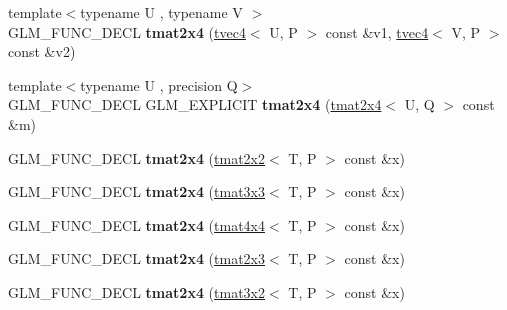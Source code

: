\begin{DoxyCompactItemize}
\item 
\hypertarget{structglm_1_1tmat2x4_ab52cdbf9a2f1ae4b9b8d3e6ef8e84039}{{\footnotesize template$<$typename U , typename V $>$ }\\G\-L\-M\-\_\-\-F\-U\-N\-C\-\_\-\-D\-E\-C\-L {\bfseries tmat2x4} (\hyperlink{structglm_1_1tvec4}{tvec4}$<$ U, P $>$ const \&v1, \hyperlink{structglm_1_1tvec4}{tvec4}$<$ V, P $>$ const \&v2)}\label{structglm_1_1tmat2x4_ab52cdbf9a2f1ae4b9b8d3e6ef8e84039}

\item 
\hypertarget{structglm_1_1tmat2x4_a927ed33ecafc04dffbdc44b25e4b5466}{{\footnotesize template$<$typename U , precision Q$>$ }\\G\-L\-M\-\_\-\-F\-U\-N\-C\-\_\-\-D\-E\-C\-L G\-L\-M\-\_\-\-E\-X\-P\-L\-I\-C\-I\-T {\bfseries tmat2x4} (\hyperlink{structglm_1_1tmat2x4}{tmat2x4}$<$ U, Q $>$ const \&m)}\label{structglm_1_1tmat2x4_a927ed33ecafc04dffbdc44b25e4b5466}

\item 
\hypertarget{structglm_1_1tmat2x4_afc1dac325dc83720bcd251de94f5fdfc}{G\-L\-M\-\_\-\-F\-U\-N\-C\-\_\-\-D\-E\-C\-L {\bfseries tmat2x4} (\hyperlink{structglm_1_1tmat2x2}{tmat2x2}$<$ T, P $>$ const \&x)}\label{structglm_1_1tmat2x4_afc1dac325dc83720bcd251de94f5fdfc}

\item 
\hypertarget{structglm_1_1tmat2x4_a315e700449248bbe7938b858a94e98ce}{G\-L\-M\-\_\-\-F\-U\-N\-C\-\_\-\-D\-E\-C\-L {\bfseries tmat2x4} (\hyperlink{structglm_1_1tmat3x3}{tmat3x3}$<$ T, P $>$ const \&x)}\label{structglm_1_1tmat2x4_a315e700449248bbe7938b858a94e98ce}

\item 
\hypertarget{structglm_1_1tmat2x4_ada474dee56734cd6ad136b0845e1f71e}{G\-L\-M\-\_\-\-F\-U\-N\-C\-\_\-\-D\-E\-C\-L {\bfseries tmat2x4} (\hyperlink{structglm_1_1tmat4x4}{tmat4x4}$<$ T, P $>$ const \&x)}\label{structglm_1_1tmat2x4_ada474dee56734cd6ad136b0845e1f71e}

\item 
\hypertarget{structglm_1_1tmat2x4_ad992a0195fb70e4ec2345b8ce248a9a6}{G\-L\-M\-\_\-\-F\-U\-N\-C\-\_\-\-D\-E\-C\-L {\bfseries tmat2x4} (\hyperlink{structglm_1_1tmat2x3}{tmat2x3}$<$ T, P $>$ const \&x)}\label{structglm_1_1tmat2x4_ad992a0195fb70e4ec2345b8ce248a9a6}

\item 
\hypertarget{structglm_1_1tmat2x4_a52740ff1048b8283e22c07c743aaf8f9}{G\-L\-M\-\_\-\-F\-U\-N\-C\-\_\-\-D\-E\-C\-L {\bfseries tmat2x4} (\hyperlink{structglm_1_1tmat3x2}{tmat3x2}$<$ T, P $>$ const \&x)}\label{structglm_1_1tmat2x4_a52740ff1048b8283e22c07c743aaf8f9}


\end{DoxyCompactItemize}
